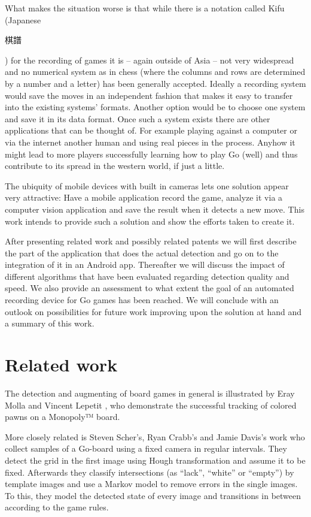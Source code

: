 	What makes the situation worse is that while there is a notation called Kifu (Japanese \begingroup\setmainfont{Droid Sans Japanese}\small\begin{CJK}{UTF8}{min}棋譜\end{CJK}\endgroup ) for the recording of games it is -- again outside of Asia -- not very widespread and no numerical system as in chess (where the columns and rows are determined by a number and a letter) has been generally accepted. Ideally a recording system would save the moves in an independent fashion that makes it easy to transfer into the existing systems' formats. Another option would be to choose one system and save it in its data format. Once such a system exists there are other applications that can be thought of. For example playing against a computer or via the internet another human and using real pieces in the process. Anyhow it might lead to more players successfully learning how to play Go (well) and thus contribute to its spread in the western world, if just a little.

	The ubiquity of mobile devices with built in cameras lets one solution appear very attractive: Have a mobile application record the game, analyze it via a computer vision application and save the result when it detects a new move. This	work intends to provide such a solution and show the efforts taken to create it.

	After presenting related work and possibly related patents we will first describe the part of the application that does the actual detection and go on to the integration of it in an Android app. Thereafter we will discuss the impact of different algorithms that have been evaluated regarding detection quality and speed. We also provide an assessment to what extent the goal of an automated recording device for Go games has been reached. We will conclude with an outlook on possibilities for future work improving upon the solution at hand and a summary of this work.


	\section{Related work}
	\label{introduction-work}
	The detection and augmenting of board games in general is illustrated by Eray Molla and Vincent Lepetit \cite{molla2010augmented}, who demonstrate the successful tracking of colored pawns on a Monopoly™ board.

	More closely related is  Steven Scher's, Ryan Crabb's and Jamie Davis's work \cite{scher2008making} who collect samples of a Go-board using a fixed camera in regular intervals. They detect the grid in the first image using Hough transformation and assume it to be fixed. Afterwards they classify intersections (as ``lack'', ``white'' or ``empty'') by template images and use a Markov model to remove errors in the single images. To this, they model the detected state of every image and transitions in between according to the game rules.

